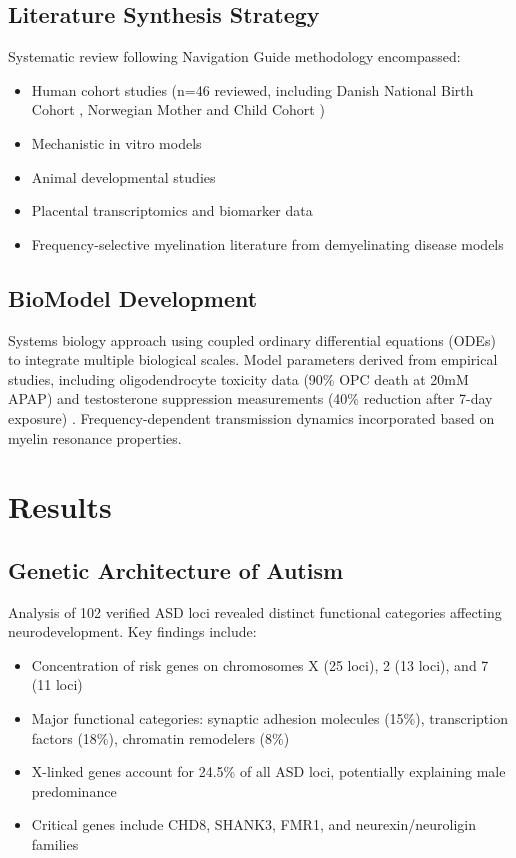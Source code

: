 \documentclass[12pt]{article}
\begin{document}
\subsection{Literature Synthesis Strategy}
Systematic review following Navigation Guide methodology \citep{navarro2025} encompassed:
\begin{itemize}
\item Human cohort studies (n=46 reviewed, including Danish National Birth Cohort \citep{liew2016}, Norwegian Mother and Child Cohort \citep{brandlistuen2013,ystrom2017})
\item Mechanistic in vitro models \citep{perez2012,posadas2019}
\item Animal developmental studies \citep{viberg2014,philippot2022,blecharz2018}
\item Placental transcriptomics and biomarker data \citep{ji2020}
\item Frequency-selective myelination literature from demyelinating disease models
\end{itemize}

\subsection{BioModel Development}
Systems biology approach using coupled ordinary differential equations (ODEs) to integrate multiple biological scales. Model parameters derived from empirical studies, including oligodendrocyte toxicity data (90\% OPC death at 20mM APAP) \citep{perez2012} and testosterone suppression measurements (40\% reduction after 7-day exposure) \citep{kristensen2016}. Frequency-dependent transmission dynamics incorporated based on myelin resonance properties.

\section{Results}

\subsection{Genetic Architecture of Autism}
Analysis of 102 verified ASD loci revealed distinct functional categories affecting neurodevelopment. Key findings include:
\begin{itemize}
\item Concentration of risk genes on chromosomes X (25 loci), 2 (13 loci), and 7 (11 loci)
\item Major functional categories: synaptic adhesion molecules (15\%), transcription factors (18\%), chromatin remodelers (8\%)
\item X-linked genes account for 24.5\% of all ASD loci, potentially explaining male predominance
\item Critical genes include CHD8, SHANK3, FMR1, and neurexin/neuroligin families
\end{itemize}
\end{document}

